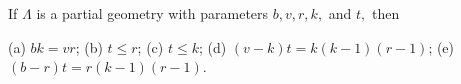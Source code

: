 If $\Lambda$ is a partial geometry with parameters $b, v, r, k,$ and $t,$ then

(a) $bk = vr$;
(b) $t \leq r$;
(c) $t \leq k$;
(d) $(v - k)t = k(k - 1)(r - 1)$;
(e) $(b - r)t = r(k - 1)(r - 1)$.
